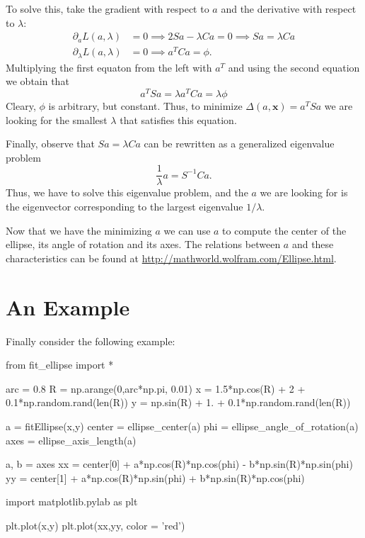 \documentclass[a4paper,11pt]{article}
\begin{document}
To solve this, take the gradient with respect to $a$ and the derivative with respect to $\lambda$:
\begin{align*}
  \partial_a L(a, \lambda) & = 0 \implies 2 S a - \lambda C a  = 0 \implies S a = \lambda C a \\
  \partial_\lambda L(a, \lambda) & = 0 \implies a^T C a = \phi.
\end{align*}
Multiplying the first equaton from the left with $a^T$ and using the second equation we obtain that
\begin{equation*}
a^T S a = \lambda a^T C a = \lambda \phi
\end{equation*}
Cleary, $\phi$ is arbitrary, but constant. Thus, to minimize
$\Delta(a, \mathbf{x})= a^T S a$ we are looking for the smallest
$\lambda$ that satisfies this equation.

Finally, observe that $S a = \lambda C a$ can be rewritten as a generalized eigenvalue problem
%
\begin{equation*}
\frac{1}{\lambda} a = S^{-1} C a.
\end{equation*}
Thus, we have to solve this eigenvalue problem, and the $a$ we are looking for is the eigenvector corresponding to the largest eigenvalue $1/\lambda$.

Now that we have the minimizing $a$ we can use $a$ to compute the center of the ellipse, its angle of rotation and its axes.
The relations between $a$ and these characteristics can be found at \url{http://mathworld.wolfram.com/Ellipse.html}.

\section{An Example}

Finally consider the following example:

\begin{pyblock}
from fit_ellipse import *

arc = 0.8
R = np.arange(0,arc*np.pi, 0.01)
x = 1.5*np.cos(R) + 2 + 0.1*np.random.rand(len(R))
y = np.sin(R) + 1. + 0.1*np.random.rand(len(R))

a = fitEllipse(x,y)
center = ellipse_center(a)
phi = ellipse_angle_of_rotation(a)
axes = ellipse_axis_length(a)

a, b = axes
xx = center[0] + a*np.cos(R)*np.cos(phi) - b*np.sin(R)*np.sin(phi)
yy = center[1] + a*np.cos(R)*np.sin(phi) + b*np.sin(R)*np.cos(phi)

import matplotlib.pylab as plt

plt.plot(x,y)
plt.plot(xx,yy, color = 'red')
\end{pyblock}
\end{document}
